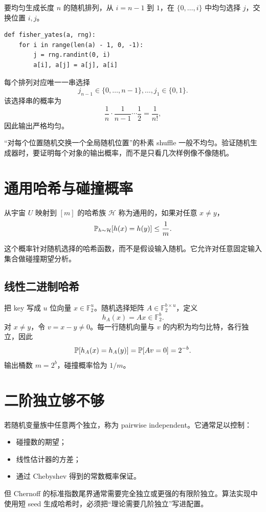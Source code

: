 要均匀生成长度 $n$ 的随机排列，从 $i=n-1$ 到 $1$，在 $\{0,\dots,i\}$ 中均匀选择 $j$，交换位置 $i,j$。

\begin{lstlisting}
def fisher_yates(a, rng):
    for i in range(len(a) - 1, 0, -1):
        j = rng.randint(0, i)
        a[i], a[j] = a[j], a[i]
\end{lstlisting}

每个排列对应唯一一串选择
\[
j_{n-1}\in\{0,\dots,n-1\},\dots,j_1\in\{0,1\}.
\]
该选择串的概率为
\[
\frac1n\cdot\frac1{n-1}\cdots\frac12=\frac1{n!},
\]
因此输出严格均匀。

\begin{warningbox}
“对每个位置随机交换一个全局随机位置”的朴素 shuffle 一般不均匀。验证随机生成器时，要证明每个对象的输出概率，而不是只看几次样例像不像随机。
\end{warningbox}

\section{通用哈希与碰撞概率}

\begin{definition}[通用哈希族]
从宇宙 $U$ 映射到 $[m]$ 的哈希族 $\mathcal H$ 称为通用的，如果对任意 $x\ne y$，
\[
\mathbb{P}_{h\sim\mathcal H}[h(x)=h(y)]\le\frac1m.
\]
\end{definition}

这个概率针对随机选择的哈希函数，而不是假设输入随机。它允许对任意固定输入集合做碰撞期望分析。

\subsection{线性二进制哈希}

把 key 写成 $u$ 位向量 $x\in\mathbb F_2^u$。随机选择矩阵
$A\in\mathbb F_2^{b\times u}$，定义
\[
h_A(x)=Ax\in\mathbb F_2^b.
\]
对 $x\ne y$，令 $v=x-y\ne0$。每一行随机向量与 $v$ 的内积为均匀比特，各行独立，因此
\[
\mathbb{P}[h_A(x)=h_A(y)]
=\mathbb{P}[Av=0]=2^{-b}.
\]
输出桶数 $m=2^b$，碰撞概率恰为 $1/m$。

\section{二阶独立够不够}

若随机变量族中任意两个独立，称为 pairwise independent。它通常足以控制：
\begin{itemize}
  \item 碰撞数的期望；
  \item 线性估计器的方差；
  \item 通过 Chebyshev 得到的常数概率保证。
\end{itemize}
但 Chernoff 的标准指数尾界通常需要完全独立或更强的有限阶独立。算法实现中使用短 seed 生成哈希时，必须把“理论需要几阶独立”写进配置。

